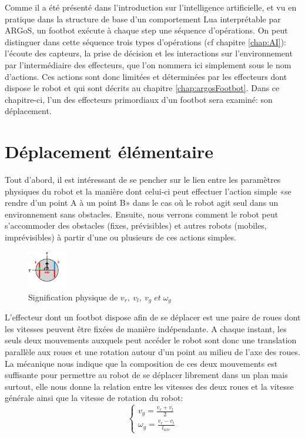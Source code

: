 Comme il a été présenté dans l'introduction sur l'intelligence artificielle, et vu en pratique dans la structure de base d'un comportement Lua interprétable par ARGoS, un footbot exécute à chaque step une séquence d'opérations. On peut distinguer dans cette séquence trois types d'opérations (cf chapitre \ref{chap:AI}): l'écoute des capteurs, la prise de décision et les interactions sur l'environnement par l'intermédiaire des effecteurs, que l'on nommera ici simplement sous le nom d'actions. Ces actions sont donc limitées et déterminées par les effecteurs dont dispose le robot et qui sont décrits au chapitre \ref{chap:argosFootbot}. Dans ce chapitre-ci, l'un des effecteurs primordiaux d'un footbot sera examiné: son déplacement.

\section{Déplacement élémentaire}

Tout d'abord, il est intéressant de se pencher sur le lien entre les paramètres physiques du robot et la manière dont celui-ci peut effectuer l'action simple «se rendre d'un point A à un point B» dans le cas où le robot agit seul dans un environnement sans obstacles. Ensuite, nous verrons comment le robot peut s’accommoder des obstacles (fixes, prévisibles) et autres robots (mobiles, imprévisibles) à partir d'une ou plusieurs de ces actions simples.

\begin{figure}
  \vspace{-3em}
  \begin{center}
    \includegraphics[width=0.15\textwidth]{robotWheels.png}
  \end{center}
  \caption{Signification physique de \(v_r,\: v_l,\: v_g \; et \; \omega_g \) \cite{argosSite1}}
  \vspace{-2em}
  \end{figure}
L'effecteur dont un footbot dispose afin de se déplacer est une paire de roues dont les vitesses peuvent être fixées de manière indépendante. A chaque instant, les seuls deux mouvements auxquels peut accéder le robot sont donc une translation parallèle aux roues et une rotation autour d'un point au milieu de l'axe des roues. La mécanique \cite{meca} nous indique que la composition de ces deux mouvements est suffisante pour permettre au robot de se déplacer librement dans un plan mais surtout, elle nous donne la relation entre les vitesses des deux roues et la vitesse générale ainsi que la vitesse de rotation du robot:
\begin{equation}
\begin{cases}
v_g=\frac{v_r+v_l}{2}\\
\omega_g=\frac{v_r-v_l}{l_{axe}}
\end{cases}  
\end{equation}

